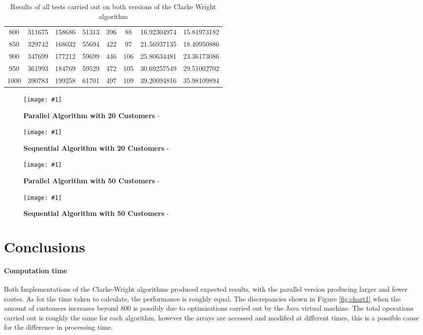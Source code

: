 \documentclass[conference]{acmsiggraph}
\newcommand{\figuremacroW}[4]{
	\begin{figure}[h] %
		\centering
		\texttt{[image: \#1]}
		\caption[#2]{\textbf{#2} - #3}
		\label{fig:#1}
	\end{figure}
}
\begin{document}
\begin{table}[b]
{{\begin{minipage}{\textwidth}
\begin{tabular}{cccccccc}
    800                  & 311675             & 158686          & 51313         & 396               & 88              & 16.92304974               & 15.81973182             \\
    850                  & 329742             & 168032          & 55694         & 422               & 97              & 21.56937135               & 18.40950886             \\
    900                  & 347699             & 177212          & 59699         & 446               & 106             & 25.80634481               & 23.36173086             \\
    950                  & 361993             & 184769          & 59529         & 472               & 105             & 30.69257549               & 29.51002702             \\
    1000                 & 390783             & 199258          & 61701         & 497               & 109             & 39.20094816               & 35.98109894             \\\hline
    \end{tabular}
   
    \caption[Table caption text]{Results of all tests carried out on both versions of the Clarke Wright algorithm}
    \label{table:name}
    \end{minipage} }
}
\end{table}

\clearpage

\figuremacroW
{t4i8simd256cond}
{Parallel Algorithm with 20 Customers}
{}
{0.76}

\figuremacroW
{t4i8simd256cond}
{Sequential Algorithm with 20 Customers}
{}
{0.76}

\figuremacroW
{t4i8simd256cond}
{Parallel Algorithm with 50 Customers}
{}
{0.755}

\figuremacroW
{t4i8simd256cond}
{Sequential Algorithm with 50 Customers}
{}
{0.75}


\section{Conclusions}
\paragraph{Computation time}
Both Implementations of the Clarke-Wright algorithms produced expected results, with the parallel version producing larger and fewer routes. As for the time taken to calculate, the performance is roughly equal.
The discrepancies shown in Figure \ref{fig:chart1} when the amount of customers increases beyond 800 is possibly due to optimisations carried out by the Java virtual machine. The total operations carried out is roughly the same for each algorithm, however the arrays are accessed and modified at different times, this is a possible cause for the difference in processing time.
\end{document}
